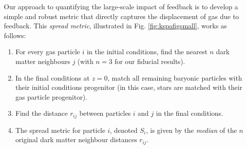 Our approach to quantifying the large-scale impact of feedback is to develop
a simple and robust metric that directly captures the displacement of gas
due to feedback. This {\it spread metric}, illustrated in Fig.
\ref{fig:kspafigsmall}, works as follows:

\begin{enumerate} 
	\item For every gas particle $i$ in the initial conditions, find the nearest
          $n$ dark matter neighbours $j$ (with $n=3$ for our fiducial results).
	\item In the final conditions at $z=0$, match all remaining baryonic particles
	      with their initial conditions progenitor (in this case, stars are
	      matched with their gas particle progenitor).
    \item Find the distance $r_{ij}$ between particles $i$ and $j$ in the
          final conditions.
    \item The spread metric for particle $i$, denoted $S_{i}$, is given by the \emph{median}
          of the $n$ original dark matter neighbour distances $r_{ij}$.
\end{enumerate}

